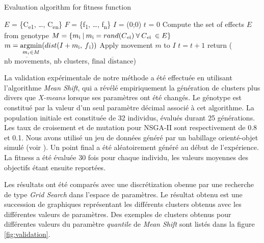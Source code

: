 \documentclass{llncs}
\newcommand{\textoverline}[1]{$\overline{\mbox{#1}}$}
\begin{document}
\begin{algorithm}
\caption{Evaluation algorithm for fitness function}\label{euclid}
  \begin{algorithmic}[1]
    \State $E$ = \{C\textsubscript{e1}, \dots, C\textsubscript{en}\} 
    \State $F$ = \{f\textsubscript{1}, \dots, f\textsubscript{n}\} 
    \State $I$ = (0;0) 
    \State $t$ = 0 
    \State Compute the set of effects $E$ from genotype
            \State $M = \{ m\textsubscript{i}\:|\:m\textsubscript{i} = rand(C\textsubscript{ei})\:\forall\:C\textsubscript{ei}\:\in E\}$
            \State $m = \operatornamewithlimits{argmin}\limits_{m_i \in M}(dist(I+m\textsubscript{i},\:f\textsubscript{i}))$
            \State Apply movement $m$ to $I$
            \State $t = t + 1$
          \EndWhile
        \EndFor
      \EndFor
      \State return (\textoverline{nb movements}, nb clusters, \textoverline{final distance})
  \end{algorithmic}
\end{algorithm}

La validation expérimentale de notre méthode a été effectuée en utilisant l'algorithme \textit{Mean Shift}, qui a révélé empiriquement la génération de clusters plus divers que \textit{X-means} lorsque ses paramètres ont été changés. Le génotype est constitué par la valeur d'un seul paramètre décimal associé à cet algorithme. La population initiale est constituée de 32 individus, évalués durant 25 générations. Les taux de croisement et de mutation pour NSGA-II sont respectivement de 0.8 et 0.1. Nous avons utilisé un jeu de données généré par un babillage orienté-objet simulé (voir ). Un point final a été aléatoirement généré au début de l'expérience. La fitness a été évaluée 30 fois pour chaque individu, les valeurs moyennes des objectifs étant ensuite reportées.

Les résultats ont été comparés avec une discrétization obenue par une recherche de type \textit{Grid Search} dans l'espace de paramètres. Le résultat obtenu est une succession de graphiques représentant les différents clusters obtenus avec les différentes valeurs de paramètres. Des exemples de clusters obtenus pour différentes valeurs du paramètre \textit{quantile} de \textit{Mean Shift} sont listés dans la figure \ref{fig:validation}.
\end{document}
